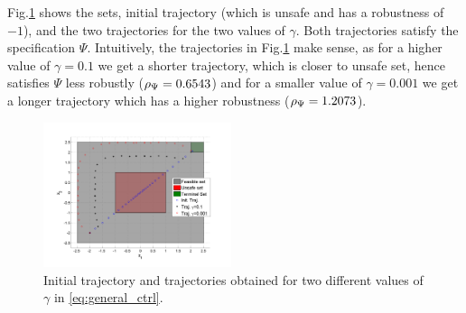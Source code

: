 Fig.\ref{fig:toy control} shows the sets, initial trajectory (which is unsafe and has a robustness of $-1$), and the two trajectories for the two values of $\gamma$. Both trajectories satisfy the specification $\Psi$. Intuitively, the trajectories in Fig.\ref{fig:toy control} make sense, as for a higher value of $\gamma=0.1$ we get a shorter trajectory, which is closer to unsafe set, hence satisfies $\Psi$ less robustly ($\rho_{\Psi}=0.6543$) and for a smaller value of $\gamma=0.001$ we get a longer trajectory which has a higher robustness ($\rho_{\Psi}=1.2073$).

\begin{figure}[t]
\centering
\includegraphics[width=0.49\textwidth]{figures/ToyExampleControl}
\caption{Initial trajectory and trajectories obtained for two different values of $\gamma$ in \eqref{eq:general_ctrl}.}
\label{fig:toy control}
\end{figure}